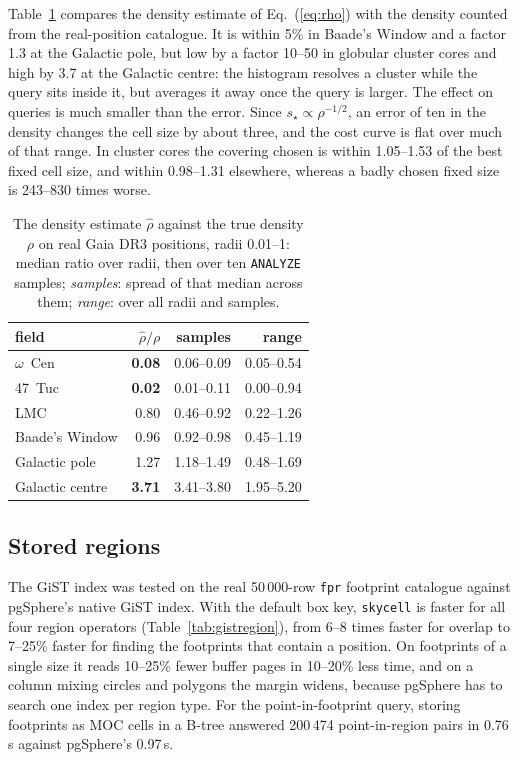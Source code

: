 Table~\ref{tab:estimator} compares the density estimate of Eq.~(\ref{eq:rho}) with the
density counted from the real-position catalogue. It is within 5\% in Baade's Window and a
factor 1.3 at the Galactic pole, but low by a factor 10--50 in globular cluster cores and
high by 3.7 at the Galactic centre: the histogram resolves a cluster while the query
sits inside it, but averages it away once the query is larger. The effect on queries is
much smaller than the error. Since $s_\star\propto\rho^{-1/2}$, an error of ten in the
density changes the cell size by about three, and the cost curve is flat over much of
that range. In cluster cores the covering chosen is within 1.05--1.53 of the best fixed
cell size, and within 0.98--1.31 elsewhere, whereas a badly chosen fixed size is
243--830 times worse.

\begin{table}
  \caption{The density estimate $\hat\rho$ against the true density $\rho$ on real Gaia
    DR3 positions, radii 0.01\degr--1\degr: median ratio over radii, then over ten
    \texttt{ANALYZE} samples; \emph{samples}: spread of that median across them;
    \emph{range}: over all radii and samples.}
  \label{tab:estimator}
  \centering
  \footnotesize
  \begin{tabular}{l rrr}
    \hline\hline
    field & $\hat\rho/\rho$ & samples & range \\
    \hline
    $\omega$~Cen           & \textbf{0.08} & 0.06--0.09 & 0.05--0.54 \\
    47~Tuc                 & \textbf{0.02} & 0.01--0.11 & 0.00--0.94 \\
    LMC                    & 0.80 & 0.46--0.92 & 0.22--1.26 \\
    Baade's Window         & 0.96 & 0.92--0.98 & 0.45--1.19 \\
    Galactic pole          & 1.27 & 1.18--1.49 & 0.48--1.69 \\
    Galactic centre        & \textbf{3.71} & 3.41--3.80 & 1.95--5.20 \\
    \hline
  \end{tabular}
\end{table}

\subsection{Stored regions}
\label{sec:tests-regions}

The GiST index was tested on the real 50\,000-row \texttt{fpr} footprint catalogue
against pgSphere's native GiST index. With the default box key, \texttt{skycell} is
faster for all four region operators (Table~\ref{tab:gistregion}), from 6--8 times
faster for overlap to 7--25\% faster for finding the footprints that contain a
position. On footprints of a single size it reads 10--25\% fewer buffer pages in
10--20\% less time, and on a column mixing circles and polygons the margin widens,
because pgSphere has to search one index per region type. For the point-in-footprint
query, storing footprints as MOC cells in a B-tree answered 200\,474 point-in-region
pairs in 0.76\,s against pgSphere's 0.97\,s.

